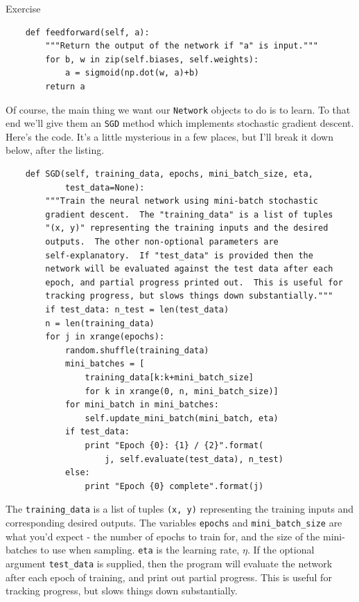 \begin{exerciseBox}{Exercise}
\begin{lstlisting}
    def feedforward(self, a):
        """Return the output of the network if "a" is input."""
        for b, w in zip(self.biases, self.weights):
            a = sigmoid(np.dot(w, a)+b)
        return a

\end{lstlisting}


Of course, the main thing we want our \texttt{Network} objects to do is to learn. To that end we'll give them an \texttt{SGD} method which implements stochastic gradient descent. Here's the code. It's a little mysterious in a few places, but I'll break it down below, after the listing.



\begin{lstlisting}
    def SGD(self, training_data, epochs, mini_batch_size, eta,
            test_data=None):
        """Train the neural network using mini-batch stochastic
        gradient descent.  The "training_data" is a list of tuples
        "(x, y)" representing the training inputs and the desired
        outputs.  The other non-optional parameters are
        self-explanatory.  If "test_data" is provided then the
        network will be evaluated against the test data after each
        epoch, and partial progress printed out.  This is useful for
        tracking progress, but slows things down substantially."""
        if test_data: n_test = len(test_data)
        n = len(training_data)
        for j in xrange(epochs):
            random.shuffle(training_data)
            mini_batches = [
                training_data[k:k+mini_batch_size]
                for k in xrange(0, n, mini_batch_size)]
            for mini_batch in mini_batches:
                self.update_mini_batch(mini_batch, eta)
            if test_data:
                print "Epoch {0}: {1} / {2}".format(
                    j, self.evaluate(test_data), n_test)
            else:
                print "Epoch {0} complete".format(j)

\end{lstlisting}


The \texttt{training\_\allowbreak{}data} is a list of tuples \texttt{(x, y)} representing the training inputs and corresponding desired outputs. The variables \texttt{epochs} and \texttt{mini\_\allowbreak{}batch\_\allowbreak{}size} are what you'd expect - the number of epochs to train for, and the size of the mini-batches to use when sampling. \texttt{eta} is the learning rate, $\eta$. If the optional argument \texttt{test\_\allowbreak{}data} is supplied, then the program will evaluate the network after each epoch of training, and print out partial progress. This is useful for tracking progress, but slows things down substantially.



\end{exerciseBox}
